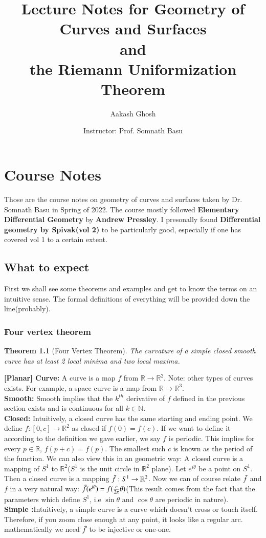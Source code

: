 \documentclass[oneside]{book}\twocolumn
\title{Lecture Notes for Geometry of Curves and Surfaces\\ and \\the Riemann Uniformization Theorem}
\author{Aakash Ghosh }
\date{Instructor: Prof. Somnath Basu}
\newtheorem{theorem}{Theorem}
\begin{document}
\maketitle
\tableofcontents

\part{Course Notes}
\onecolumn
Those are the course notes on geometry of curves and surfaces taken by Dr. Somnath Basu in Spring of 2022. The course mostly followed \textbf{Elementary Differential Geometry} by \textbf{Andrew Pressley}. I presonally found \textbf{Differential geometry by Spivak(vol 2)} to be particularly good, especially if one has covered vol 1 to a certain extent.
\twocolumn
\chapter{What to expect}
First we shall see some theorems and examples and get to know the terms on an intuitive sense. The formal definitions of everything will be provided down the line(probably).
\section{Four vertex theorem}
\begin{theorem}[Four Vertex Theorem]
The curvature of a simple closed smooth curve has at least 2 local minima and two local maxima.
\end{theorem}
\textbf{[Planar] Curve:} A curve is a map $f$ from $\mathbb R\to\mathbb R^2$. Note: other types of curves exists. For example, a space curve is a map from $\mathbb R\to\mathbb R^3$.\\
\textbf{Smooth:} Smooth implies that the $k^{th}$ derivative of $f$ defined in the previous section exists and is continuous for all $k\in\mathbb N$.\\
\textbf{Closed:} Intuitively, a closed curve has the same starting and ending point. We define $f:[0,c]\to\mathbb R^2$ as closed if $f(0)=f(c)$. If we want to define it according to the definition we gave earlier, we say $f$ is periodic. This implies for every $p\in\mathbb R$, $f(p+c)=f(p)$. The smallest such $c$ is known as the period of the function. We can also view this in an geometric way: A closed curve is a mapping of $S^1$ to $\mathbb R^2$($S^1$ is the unit circle in $\mathbb R^2$ plane). Let $e^{i\theta}$ be a point on $S^1$. Then a closed curve is a mapping $\Tilde{f}:S^1\to \mathbb{R}^2$. Now we can of course relate $\Tilde{f}$ and $f$ in a very natural way: $\Tilde{f}(e^{i\theta})=f(\frac{c}{2\pi}\theta)$(This result comes from the fact that the parameters which define $S^1$, i.e $\sin\theta$ and $\cos\theta$ are periodic in nature).\\
\textbf{Simple :}Intuitively, a simple curve is a curve which doesn't cross or touch itself. Therefore, if you zoom close enough at any point, it looks like a regular arc. mathematically we need $\Tilde{f}$ to be injective or one-one.
\end{document}
